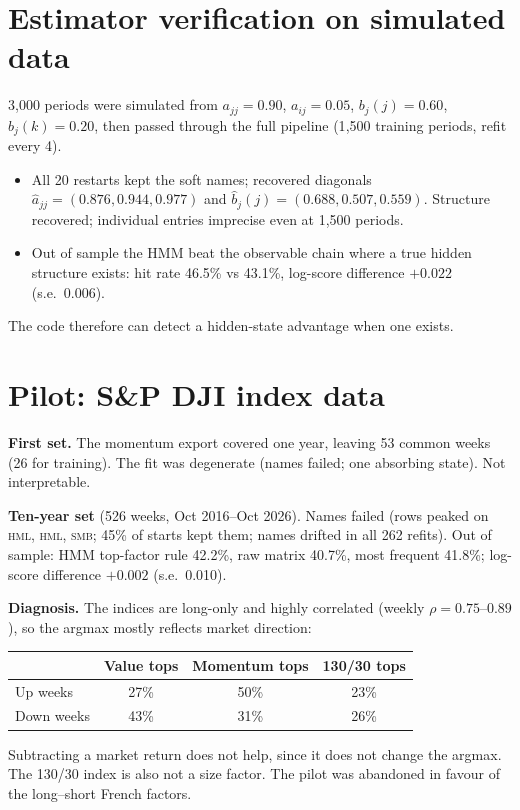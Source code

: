 \documentclass[11pt]{article}
\newcommand{\SMB}{\textsc{smb}}
\newcommand{\HML}{\textsc{hml}}
\begin{document}
\section{Estimator verification on simulated data}\label{sec:sim}

3{,}000 periods were simulated from $a_{jj}=0.90$, $a_{ij}=0.05$, $b_j(j)=0.60$, $b_j(k)=0.20$, then passed through the full pipeline (1{,}500 training periods, refit every 4).
\begin{itemize}
\item All 20 restarts kept the soft names; recovered diagonals $\hat a_{jj}=(0.876,0.944,0.977)$ and $\hat b_j(j)=(0.688,0.507,0.559)$. Structure recovered; individual entries imprecise even at 1{,}500 periods.
\item Out of sample the HMM beat the observable chain where a true hidden structure exists: hit rate 46.5\% vs 43.1\%, log-score difference $+0.022$ (s.e.\ 0.006).
\end{itemize}
The code therefore can detect a hidden-state advantage when one exists.

\section{Pilot: S\&P DJI index data}\label{sec:pilot}

\textbf{First set.} The momentum export covered one year, leaving 53 common weeks (26 for training). The fit was degenerate (names failed; one absorbing state). Not interpretable.

\textbf{Ten-year set} (526 weeks, Oct 2016--Oct 2026). Names failed (rows peaked on \HML, \HML, \SMB; 45\% of starts kept them; names drifted in all 262 refits). Out of sample: HMM top-factor rule 42.2\%, raw matrix 40.7\%, most frequent 41.8\%; log-score difference $+0.002$ (s.e.\ 0.010).

\textbf{Diagnosis.} The indices are long-only and highly correlated (weekly $\rho=0.75$--$0.89$), so the argmax mostly reflects market direction:
\begin{center}
\begin{tabular}{lccc}
\toprule
 & Value tops & Momentum tops & 130/30 tops \\
\midrule
Up weeks & 27\% & 50\% & 23\% \\
Down weeks & 43\% & 31\% & 26\% \\
\bottomrule
\end{tabular}
\end{center}
Subtracting a market return does not help, since it does not change the argmax. The 130/30 index is also not a size factor. The pilot was abandoned in favour of the long--short French factors.
\end{document}
